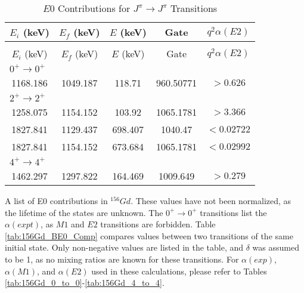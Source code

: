 \begin{portrait}
    \begin{longtable}{c|c|c|c|c}
        \caption{$E0$ Contributions for $J^{\pi}\rightarrow J^{\pi}$ Transitions}
        \label{tab:156Gd_E0}\\
        \toprule
        $E_i$ (keV)	&	$E_f$ (keV)	& $E$ (keV)	&	Gate &		$q^2\alpha(E2)$		\\
        \hline
        \endfirsthead
        \toprule
        \caption{$E0$ Contributions for $J^{\pi}\rightarrow J^{\pi}$ Transitions} \\
        $E_i$ (keV)	&	$E_f$ (keV)	& $E$ (keV)	&	Gate &		$q^2\alpha(E2)$		\\
        \hline
	    \endhead
	    \multicolumn{5}{l}{$0^+\rightarrow 0^+$} 	\\ \hline
        1168.186 & 1049.187 &  118.71 & 960.50771 & $>0.626$ \\\hline
        \multicolumn{5}{l}{$2^+\rightarrow 2^+$} 	\\ \hline
        1258.075 & 1154.152 & 103.92 & 1065.1781 & $>3.366$  \\ \hline
        1827.841 & 1129.437 & 698.407 & 1040.47 & $<0.02722$  \\ \hline
        1827.841 & 1154.152 & 673.684 & 1065.1781 & $<0.02992$  \\ \hline
        \multicolumn{5}{l}{$4^+\rightarrow 4^+$} 	\\ \hline
        1462.297 & 1297.822 & 164.469 & 1009.649 &  $>0.279$  \\
        \bottomrule
	\end{longtable}
    \item{A list of E0 contributions in $^{156}Gd$. These values have not been normalized, as the lifetime of the states are unknown. The $0^+\rightarrow 0^+$ transitions list the $\alpha(expt)$, as $M1$ and $E2$ transitions are forbidden. Table \ref{tab:156Gd_BE0_Comp} compares values between two transitions of the same initial state. Only non-negative values are listed in the table, and $\delta$ was assumed to be 1, as no mixing ratios are known for these transitions. For $\alpha(exp)$, $\alpha(M1)$, and $\alpha(E2)$ used in these calculations, please refer to Tables \ref{tab:156Gd_0_to_0}-\ref{tab:156Gd_4_to_4}.}
\end{portrait}